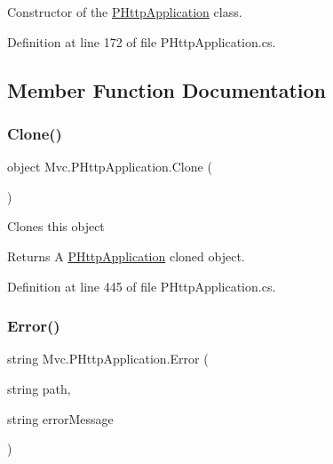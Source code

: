 Constructor of the \hyperlink{class_mvc_1_1_p_http_application}{P\+Http\+Application} class. 



Definition at line 172 of file P\+Http\+Application.\+cs.



\subsection{Member Function Documentation}
\mbox{\label{class_mvc_1_1_p_http_application_a9497e9f68b567946aa16f67c9536bb21}} 
\subsubsection{\texorpdfstring{Clone()}{Clone()}}
{\footnotesize\ttfamily object Mvc.\+P\+Http\+Application.\+Clone (\begin{DoxyParamCaption}{ }\end{DoxyParamCaption})}



Clones this object 

\begin{DoxyReturn}{Returns}
A \hyperlink{class_mvc_1_1_p_http_application}{P\+Http\+Application} cloned object.
\end{DoxyReturn}


Definition at line 445 of file P\+Http\+Application.\+cs.

\mbox{\label{class_mvc_1_1_p_http_application_acb04996af75e14fdfdc1dcacf7a52247}} 
\subsubsection{\texorpdfstring{Error()}{Error()}}
{\footnotesize\ttfamily string Mvc.\+P\+Http\+Application.\+Error (\begin{DoxyParamCaption}\item[{string}]{path,  }\item[{string}]{error\+Message }\end{DoxyParamCaption})}



